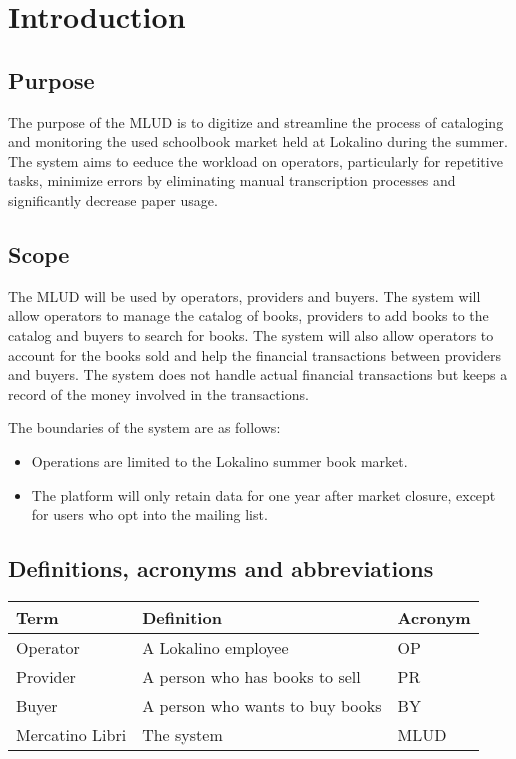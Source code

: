 \chapter{Introduction}

\section{Purpose}

The purpose of the MLUD is to digitize and streamline the process of cataloging and monitoring the used schoolbook market held at Lokalino during the summer. The system aims to eeduce the workload on operators, particularly for repetitive tasks, minimize errors by eliminating manual transcription processes and significantly decrease paper usage.

\section{Scope}

The MLUD will be used by operators, providers and buyers. The system will allow operators to manage the catalog of books, providers to add books to the catalog and buyers to search for books. The system will also allow operators to account for the books sold and help the financial transactions between providers and buyers.
The system does not handle actual financial transactions but keeps a record of the money involved in the transactions.

\noindent The boundaries of the system are as follows:
\begin{itemize}
    \item Operations are limited to the Lokalino summer book market.
    \item The platform will only retain data for one year after market closure, except for users who opt into the mailing list.
\end{itemize}

\section{Definitions, acronyms and abbreviations}

\begin{table}[H]
    \centering
    \begin{tabular}{|l|l|l|}
        \hline
        \textbf{Term}   & \textbf{Definition}             & \textbf{Acronym} \\ \hline
        Operator        & A Lokalino employee             & OP               \\
        Provider        & A person who has books to sell  & PR               \\
        Buyer           & A person who wants to buy books & BY               \\
        Mercatino Libri & The system                      & MLUD             \\\hline
    \end{tabular}
\end{table}